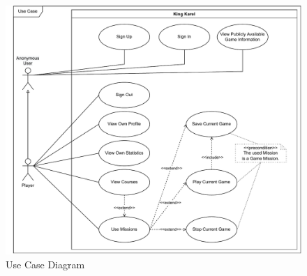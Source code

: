 \begin{figure}
    \centering
    \includegraphics[width=1\linewidth]{assets/design/usecasediagram.pdf}
    \caption{Use Case Diagram}
    \label{fig:usecasediagram}
\end{figure}
